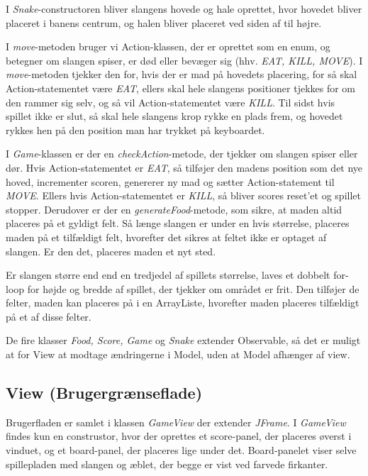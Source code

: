 \documentclass{report}
\begin{document}
I \textit{Snake}-constructoren bliver slangens hovede og hale oprettet, hvor hovedet bliver placeret i banens centrum, og halen bliver placeret ved siden af til højre.

I \textit{move}-metoden bruger vi Action-klassen, der er oprettet som en enum, og betegner om slangen spiser, er død eller bevæger sig (hhv. \textit{EAT, KILL, MOVE}). I \textit{move}-metoden tjekker den for, hvis der er mad på hovedets placering, for så skal Action-statementet være \textit{EAT}, ellers skal hele slangens positioner tjekkes for om den rammer sig selv, og så vil Action-statementet være \textit{KILL}. Til sidst hvis spillet ikke er slut, så skal hele slangens krop rykke en plads frem, og hovedet rykkes hen på den position man har trykket på keyboardet.
\linebreak

I \textit{Game}-klassen er der en \textit{checkAction}-metode, der tjekker om slangen spiser eller dør. Hvis Action-statementet er \textit{EAT}, så tilføjer den madens position som det nye hoved, incrementer scoren, genererer ny mad og sætter Action-statement til \textit{MOVE}.
Ellers hvis Action-statementet er \textit{KILL}, så bliver scores reset'et og spillet stopper.
Derudover er der en \textit{generateFood}-metode, som sikre, at maden altid placeres på et gyldigt felt. Så længe slangen er under en hvis størrelse, placeres maden på et tilfældigt felt, hvorefter det sikres at feltet ikke er optaget af slangen. Er den det, placeres maden et nyt sted.

Er slangen større end end en tredjedel af spillets størrelse, laves et dobbelt for-loop for højde og bredde af spillet, der tjekker om området er frit. Den tilføjer de felter, maden kan placeres på i en ArrayListe, hvorefter maden placeres tilfældigt på et af disse felter.

De fire klasser \textit{Food, Score, Game} og \textit{Snake} extender Observable, så det er muligt at for View at modtage ændringerne i Model, uden at Model afhænger af view.

\subsection{View (Brugergrænseflade)}
Brugerfladen er samlet i klassen \textit{GameView} der extender \textit{JFrame}. I \textit{GameView} findes kun en construstor, hvor der oprettes et score-panel, der placeres øverst i vinduet, og et board-panel, der placeres lige under det. Board-panelet viser selve spillepladen med slangen og æblet, der begge er vist ved farvede firkanter. 
\linebreak
\end{document}
